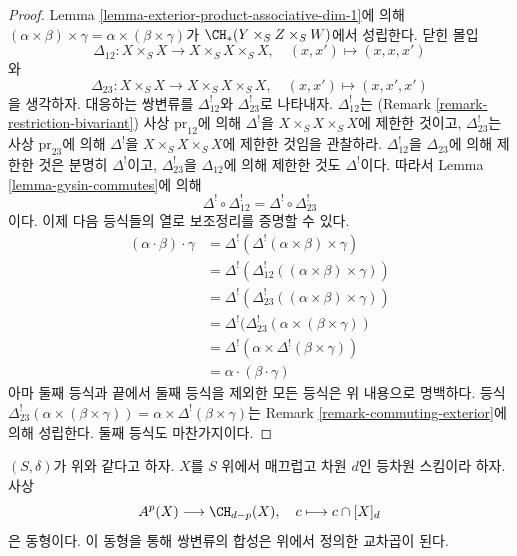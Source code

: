 \begin{proof}
Lemma \ref{lemma-exterior-product-associative-dim-1}에 의해
$(\alpha \times \beta) \times \gamma =
\alpha \times (\beta \times \gamma)$가
$\CH_*(Y \times_S Z \times_S W)$에서 성립한다. 닫힌 몰입
$$
\Delta_{12} : X \times_S X \longrightarrow X \times_S X \times_S X,
\quad (x, x') \mapsto (x, x, x')
$$
와
$$
\Delta_{23} : X \times_S X \longrightarrow X \times_S X \times_S X,
\quad (x, x') \mapsto (x, x', x')
$$
을 생각하자. 대응하는 쌍변류를 $\Delta_{12}^!$와
$\Delta_{23}^!$로 나타내자. $\Delta_{12}^!$는
(Remark \ref{remark-restriction-bivariant}) 사상 $\text{pr}_{12}$에
의해 $\Delta^!$을 $X \times_S X \times_S X$에 제한한 것이고,
$\Delta_{23}^!$는 사상 $\text{pr}_{23}$에 의해 $\Delta^!$을
$X \times_S X \times_S X$에 제한한 것임을 관찰하라.
$\Delta_{12}^!$을 $\Delta_{23}$에 의해 제한한 것은 분명히
$\Delta^!$이고, $\Delta_{23}^!$을 $\Delta_{12}$에 의해 제한한 것도
$\Delta^!$이다. 따라서 Lemma \ref{lemma-gysin-commutes}에 의해
$$
\Delta^! \circ \Delta_{12}^! =
\Delta^! \circ \Delta_{23}^! 
$$
이다. 이제 다음 등식들의 열로 보조정리를 증명할 수 있다.
\begin{align*}
(\alpha \cdot \beta) \cdot \gamma
& =
\Delta^!(\Delta^!(\alpha \times \beta) \times \gamma) \\
& =
\Delta^!(\Delta_{12}^!((\alpha \times \beta) \times \gamma)) \\
& =
\Delta^!(\Delta_{23}^!((\alpha \times \beta) \times \gamma)) \\
& =
\Delta^!(\Delta_{23}^!(\alpha \times (\beta \times \gamma)) \\
& =
\Delta^!(\alpha \times \Delta^!(\beta \times \gamma)) \\
& =
\alpha \cdot (\beta \cdot \gamma)
\end{align*}
아마 둘째 등식과 끝에서 둘째 등식을 제외한 모든 등식은 위 내용으로
명백하다. 등식
$\Delta_{23}^!(\alpha \times (\beta \times \gamma)) =
\alpha \times \Delta^!(\beta \times \gamma)$는 Remark
\ref{remark-commuting-exterior}에 의해 성립한다. 둘째 등식도
마찬가지이다.
\end{proof}

\begin{lemma}
\label{lemma-identify-chow-for-smooth-dim-1}
$(S, \delta)$가 위와 같다고 하자. $X$를 $S$ 위에서 매끄럽고 차원
$d$인 등차원 스킴이라 하자. 사상
$$
A^p(X) \longrightarrow \CH_{d - p}(X),\quad
c \longmapsto c \cap [X]_d
$$
은 동형이다. 이 동형을 통해 쌍변류의 합성은 위에서 정의한 교차곱이
된다.
\end{lemma}

